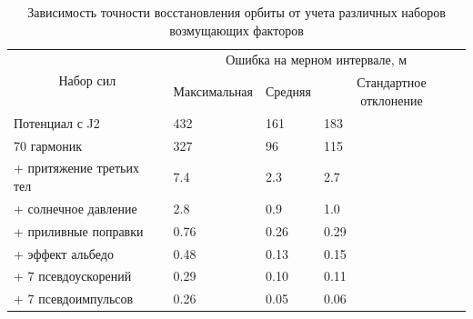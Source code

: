\begin{table}[h!]
    \centering
    \renewcommand{\arraystretch}{1.5}
    \begin{tabular}{|l|lll|}
    \hline
    \multicolumn{1}{|c|}{\multirow{2}{*}{Набор сил}} & \multicolumn{3}{c|}{Ошибка на мерном интервале, м}                                                             \\ \cline{2-4} 
    \multicolumn{1}{|c|}{}                           & \multicolumn{1}{c|}{Максимальная} & \multicolumn{1}{c|}{Средняя} & \multicolumn{1}{c|}{Стандартное отклонение} \\ \hline
    Потенциал с J2                                   & \multicolumn{1}{l|}{432}          & \multicolumn{1}{l|}{161}     & 183                                         \\ \hline
    70 гармоник                                      & \multicolumn{1}{l|}{327}          & \multicolumn{1}{l|}{96}      & 115                                         \\ \hline
    + притяжение третьих тел                         & \multicolumn{1}{l|}{7.4}          & \multicolumn{1}{l|}{2.3}     & 2.7                                         \\ \hline
    + солнечное давление                             & \multicolumn{1}{l|}{2.8}          & \multicolumn{1}{l|}{0.9}     & 1.0                                         \\ \hline
    + приливные поправки                             & \multicolumn{1}{l|}{0.76}         & \multicolumn{1}{l|}{0.26}    & 0.29                                        \\ \hline
    + эффект альбедо                                 & \multicolumn{1}{l|}{0.48}         & \multicolumn{1}{l|}{0.13}    & 0.15                                        \\ \hline
    + 7 псевдоускорений                              & \multicolumn{1}{l|}{0.29}         & \multicolumn{1}{l|}{0.10}    & 0.11                                        \\ \hline
    + 7 псевдоимпульсов                              & \multicolumn{1}{l|}{0.26}         & \multicolumn{1}{l|}{0.05}    & 0.06                                        \\ \hline
    \end{tabular}
    \caption{Зависимость точности восстановления орбиты от учета различных наборов
    возмущающих факторов}
    \label{tab:lageos2_exp}
\end{table}

